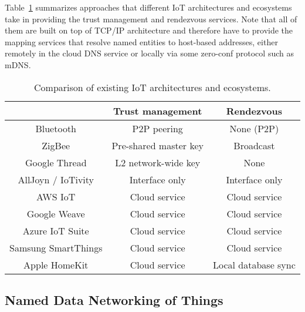 Table~\ref{tab:existing-ecosystems} summarizes approaches that different IoT architectures and ecosystems take in providing the trust management and rendezvous services.
Note that all of them are built on top of TCP/IP architecture and therefore have to provide the mapping services that resolve named entities to host-based addresses, either remotely in the cloud DNS service or locally via some zero-conf protocol such as mDNS.

\begin{table}[!t]
\renewcommand{\arraystretch}{1.3}
\caption{Comparison of existing IoT architectures and ecosystems.}
\label{tab:existing-ecosystems}
\centering
\begin{tabular}{|c|c|c|}
\hline
 & Trust management & Rendezvous\\
\hline
Bluetooth & P2P peering & None (P2P)\\
\hline
ZigBee & Pre-shared master key & Broadcast\\
\hline
Google Thread & L2 network-wide key & None\\
\hline
AllJoyn / IoTivity & Interface only & Interface only\\
\hline
AWS IoT & Cloud service & Cloud service\\
\hline
Google Weave & Cloud service & Cloud service\\
\hline
Azure IoT Suite & Cloud service & Cloud service\\
\hline
Samsung SmartThings & Cloud service & Cloud service\\
\hline
Apple HomeKit & Cloud service & Local database sync\\
\hline
\end{tabular}
\end{table}


\subsection{Named Data Networking of Things}

